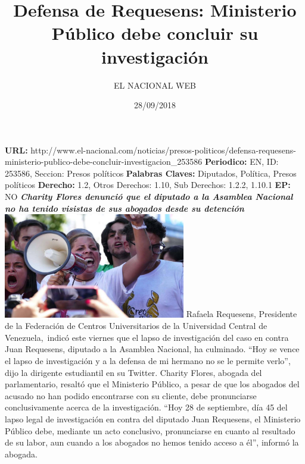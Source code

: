 \documentclass{article}%
\title{\textbf{Defensa de Requesens: Ministerio Público debe concluir su investigación}}%
\author{EL NACIONAL WEB}%
\date{28/09/2018}%
\begin{document}
%
\normalsize%
\maketitle%
\textbf{URL: }%
http://www.el{-}nacional.com/noticias/presos{-}politicos/defensa{-}requesens{-}ministerio{-}publico{-}debe{-}concluir{-}investigacion\_253586\newline%
%
\textbf{Periodico: }%
EN, %
ID: %
253586, %
Seccion: %
Presos políticos\newline%
%
\textbf{Palabras Claves: }%
Diputados, Política, Presos políticos\newline%
%
\textbf{Derecho: }%
1.2, %
Otros Derechos: %
1.10, %
Sub Derechos: %
1.2.2, 1.10.1\newline%
%
\textbf{EP: }%
NO\newline%
\newline%
%
\textbf{\textit{Charity Flores denunció que el diputado a la Asamblea Nacional no ha tenido visistas de sus abogados desde su detención}}%
\newline%
\newline%
%
\includegraphics[width=300px]{84.jpg}%
\newline%
%
Rafaela Requesens, Presidente de la Federación de Centros Universitarios de la Universidad Central de Venezuela,~indicó este viernes que el lapso de investigación del caso en contra Juan Requesens, diputado a la Asamblea Nacional, ha culminado.%
\newline%
%
“Hoy se vence el lapso de investigación y a la defensa de mi hermano no se le permite verlo”, dijo la dirigente estudiantil en su Twitter.%
\newline%
%
Charity Flores, abogada del parlamentario, resaltó que el Ministerio Público, a pesar de que los abogados del acusado no han podido encontrarse con su cliente, debe pronunciarse conclusivamente acerca de la investigación.%
\newline%
%
“Hoy 28 de septiembre, día 45 del lapso legal de investigación en contra del diputado Juan Requesens, el Ministerio Público debe, mediante un acto conclusivo, pronunciarse en cuanto al resultado de su labor, aun cuando a los abogados no hemos tenido acceso a él”, informó la abogada.%
\newline%
%
\end{document}
